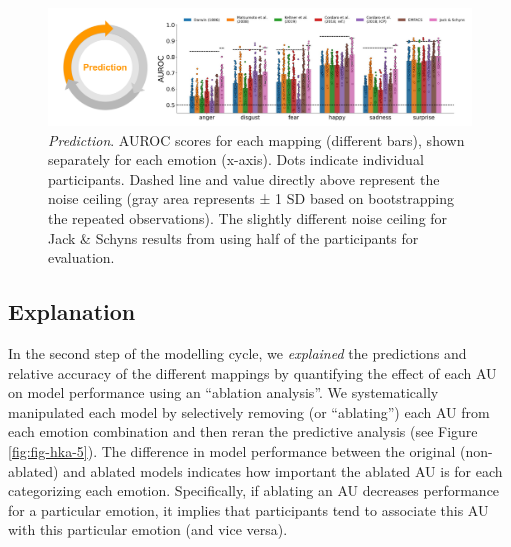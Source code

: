 \documentclass[11pt,american,a4paper,oneside,]{memoir} %
\begin{document}
\begin{figure}
\centering
\includegraphics{_bookdown_files/hypothesis-kernel-analysis-files/figures/figure_4.pdf}
\caption{\label{fig:fig-hka-4}\emph{Prediction}. AUROC scores for each mapping (different bars), shown separately for each emotion (x-axis). Dots indicate individual participants. Dashed line and value directly above represent the noise ceiling (gray area represents ± 1 SD based on bootstrapping the repeated observations). The slightly different noise ceiling for Jack \& Schyns results from using half of the participants for evaluation.}
\end{figure}



\hypertarget{explanation}{%
\subsection{Explanation}\label{explanation}}

In the second step of the modelling cycle, we \emph{explained} the predictions and relative accuracy of the different mappings by quantifying the effect of each AU on model performance using an ``ablation analysis''. We systematically manipulated each model by selectively removing (or ``ablating'') each AU from each emotion combination and then reran the predictive analysis (see Figure \ref{fig:fig-hka-5}). The difference in model performance between the original (non-ablated) and ablated models indicates how important the ablated AU is for each categorizing each emotion. Specifically, if ablating an AU decreases performance for a particular emotion, it implies that participants tend to associate this AU with this particular emotion (and vice versa).
\end{document}
